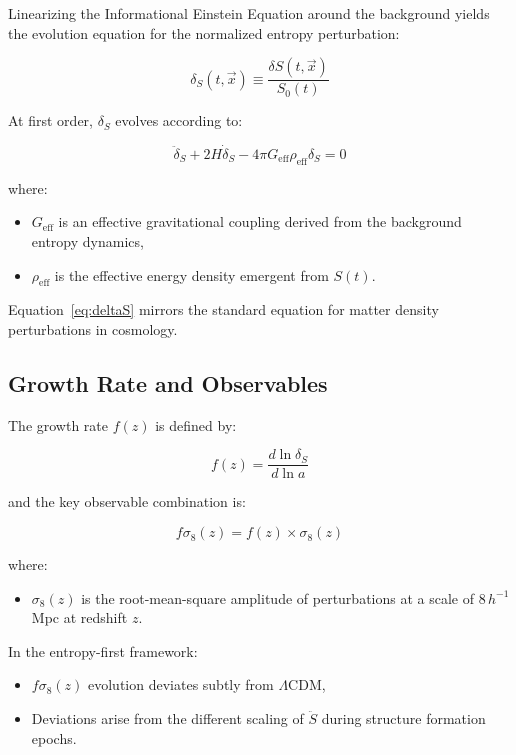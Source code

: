 \documentclass{article}
\begin{document}
Linearizing the Informational Einstein Equation around the background yields the evolution equation for the normalized entropy perturbation:

\[
\delta_S(t, \vec{x}) \equiv \frac{\delta S(t, \vec{x})}{S_0(t)}
\]

At first order, $\delta_S$ evolves according to:

\begin{equation}
\ddot{\delta}_S + 2H \dot{\delta}_S - 4\pi G_{\text{eff}} \rho_{\text{eff}} \delta_S = 0
\label{eq:deltaS}
\end{equation}

where:
\begin{itemize}
    \item $G_{\text{eff}}$ is an effective gravitational coupling derived from the background entropy dynamics,
    \item $\rho_{\text{eff}}$ is the effective energy density emergent from $S(t)$.
\end{itemize}

Equation~\eqref{eq:deltaS} mirrors the standard equation for matter density perturbations in cosmology.

\subsection{Growth Rate and Observables}

The growth rate $f(z)$ is defined by:

\begin{equation}
f(z) = \frac{d \ln \delta_S}{d \ln a}
\end{equation}

and the key observable combination is:

\begin{equation}
f\sigma_8(z) = f(z) \times \sigma_8(z)
\end{equation}

where:
\begin{itemize}
    \item $\sigma_8(z)$ is the root-mean-square amplitude of perturbations at a scale of $8 \, h^{-1}$ Mpc at redshift $z$.
\end{itemize}

In the entropy-first framework:
\begin{itemize}
    \item $f\sigma_8(z)$ evolution deviates subtly from $\Lambda$CDM,
    \item Deviations arise from the different scaling of $\ddot{S}$ during structure formation epochs.
\end{itemize}
\end{document}
